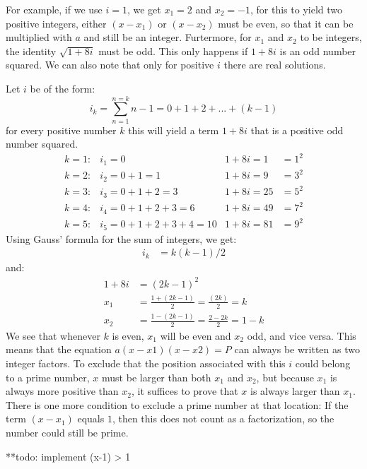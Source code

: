\documentclass[12pt]{article}
\begin{document}
For example, if we use $i=1$, we get $x_1=2$ and $x_2=-1$, for this to yield two positive integers, either $(x-x_1)$ or $(x-x_2)$ must be even, so that it can be multiplied with $a$ and still be an integer.
Furtermore, for $x_1$ and $x_2$ to be integers, the identity $\sqrt{1 + 8i}$ must be odd. This only happens if $1+8i$ is an odd number squared. We can also note that only for positive $i$ there are real solutions.\par
Let $i$ be of the form:
\begin{equation}
i_k = \sum_{n=1}^{n=k}{n-1} = 0 + 1 + 2 + ... + (k-1)
\end{equation}
for every positive number $k$ this will yield a term $1 + 8i$ that is a positive odd number squared.
\begin{align*}
k=1:	&	i_1=0 & 1+8i = 1    & = 1^2\\
k=2:	&	i_2=0+1=1 & 1+8i =9& = 3^2\\
k=3:	&	i_3=0+1+2=3 & 1+8i =25& = 5^2\\
k=4:	&	i_4=0+1+2+3=6 & 1+8i =49& = 7^2\\
k=5:	&	i_5=0+1+2+3+4=10 & 1+8i =81& = 9^2
\end{align*}
Using Gauss' formula for the sum of integers, we get:
\begin{align*}
i_k &= k(k-1)/2
\end{align*}
and:
\begin{align*}
1+8i &= (2k-1)^2\\
x_1 &= \frac{1 + (2k-1)}{2} = \frac{(2k)}{2}=k\\
x_2 &= \frac{1 - (2k-1)}{2}=\frac{2 - 2k}{2}=1-k
\end{align*}
We see that whenever $k$ is even, $x_1$ will be even and $x_2$ odd, and vice versa. This means that the equation $a(x-x1)(x-x2)=P$ can always be written as two integer factors. To exclude that the position associated with this $i$ could belong to a prime number, $x$ must be larger than both $x_1$ and $x_2$, but because $x_1$ is always more positive than $x_2$, it suffices to prove that $x$ is always larger than $x_1$. There is one more condition to exclude a prime number at that location: If the term $(x-x_1)$ equals $1$, then this does not count as a factorization, so the number could still be prime.\par

**todo: implement (x-1) > 1 
\end{document}
